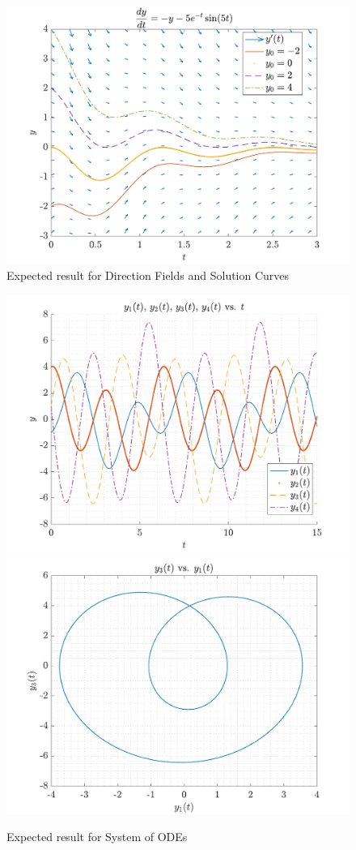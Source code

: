 \begin{figure}[!hbtp]
  \centering
  \includegraphics[height=0.3\textheight]{../Math.3341.Lab.14.ans/lab_14_figure_1.pdf}
  \caption{Expected result for Direction Fields and Solution Curves}
  \label{fig:}
\end{figure}

\begin{figure}[!hbtp]
  \centering
  \includegraphics[height=0.3\textheight]{../Math.3341.Lab.14.ans/lab_14_figure_2.pdf}
  \includegraphics[height=0.3\textheight]{../Math.3341.Lab.14.ans/lab_14_figure_3.pdf}
  \caption{Expected result for System of ODEs}
  \label{fig:}
\end{figure}


